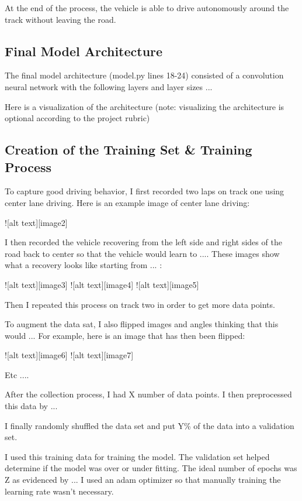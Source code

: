 \documentclass[a4paper, 11pt, DIV=14]{scrartcl}
\begin{document}
At the end of the process, the vehicle is able to drive autonomously around the track without leaving the road.

\subsection{Final Model Architecture}

The final model architecture (model.py lines 18-24) consisted of a convolution neural network with the following layers and layer sizes ...

Here is a visualization of the architecture (note: visualizing the architecture is optional according to the project rubric)



\subsection{Creation of the Training Set \& Training Process}

To capture good driving behavior, I first recorded two laps on track one using center lane driving. Here is an example image of center lane driving:

![alt text][image2]

I then recorded the vehicle recovering from the left side and right sides of the road back to center so that the vehicle would learn to .... These images show what a recovery looks like starting from ... :

![alt text][image3]
![alt text][image4]
![alt text][image5]

Then I repeated this process on track two in order to get more data points.

To augment the data sat, I also flipped images and angles thinking that this would ... For example, here is an image that has then been flipped:

![alt text][image6]
![alt text][image7]

Etc ....

After the collection process, I had X number of data points. I then preprocessed this data by ...


I finally randomly shuffled the data set and put Y\% of the data into a validation set. 

I used this training data for training the model. The validation set helped determine if the model was over or under fitting. The ideal number of epochs was Z as evidenced by ... I used an adam optimizer so that manually training the learning rate wasn't necessary.


\printbibliography
\end{document}
